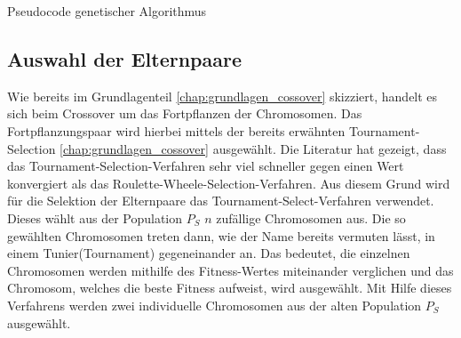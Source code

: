 \begin{algorithm}[H]
	\begin{algorithmic}[1]
%		
		
		 				
		 
	 	\ENDFOR
		\ENDFOR
		\ELSE
		\ENDIF
	\ENDWHILE
	\caption{Pseudocode genetischer Algorithmus}
	\label{code:pseudocode_genetic_algo}
\end{algorithmic}
\end{algorithm}

\subsection{Auswahl der Elternpaare}

Wie bereits im Grundlagenteil \ref{chap:grundlagen_cossover} skizziert, handelt es sich beim Crossover um das Fortpflanzen der Chromosomen.
Das Fortpflanzungspaar wird hierbei mittels der bereits erwähnten Tournament-Selection \ref{chap:grundlagen_cossover} ausgewählt. Die Literatur \cite{zhong2005comparison} hat gezeigt, dass das Tournament-Selection-Verfahren sehr viel schneller gegen einen Wert konvergiert als das Roulette-Wheele-Selection-Verfahren. Aus diesem Grund wird für die Selektion der Elternpaare das Tournament-Select-Verfahren verwendet. Dieses wählt aus der Population $P_S$ $n$ zufällige Chromosomen aus. Die so gewählten Chromosomen treten dann, wie der Name bereits vermuten lässt, in einem \glqq Tunier\grqq{ }(Tournament) gegeneinander an.  Das bedeutet, die einzelnen Chromosomen werden mithilfe des Fitness-Wertes  miteinander verglichen und das Chromosom, welches die beste Fitness aufweist, wird ausgewählt. Mit Hilfe dieses Verfahrens werden zwei individuelle Chromosomen aus der alten Population $P_S$ ausgewählt.
 
